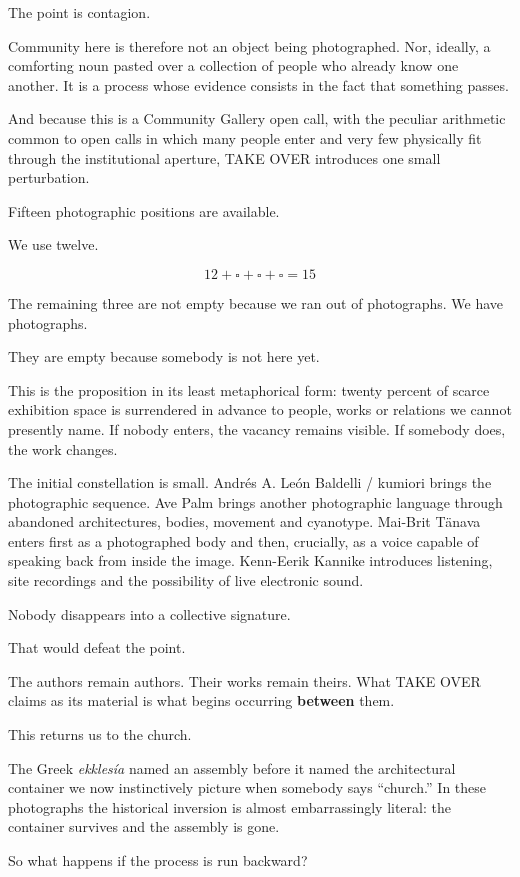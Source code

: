 The point is contagion.

Community here is therefore not an object being photographed. Nor,
ideally, a comforting noun pasted over a collection of people who
already know one another. It is a process whose evidence consists in the
fact that something passes.

And because this is a Community Gallery open call, with the peculiar
arithmetic common to open calls in which many people enter and very few
physically fit through the institutional aperture, TAKE OVER introduces
one small perturbation.

Fifteen photographic positions are available.

We use twelve.

\[
12+\square+\square+\square=15
\]

The remaining three are not empty because we ran out of photographs. We
have photographs.

They are empty because somebody is not here yet.

This is the proposition in its least metaphorical form: twenty percent
of scarce exhibition space is surrendered in advance to people, works or
relations we cannot presently name. If nobody enters, the vacancy
remains visible. If somebody does, the work changes.

The initial constellation is small. Andrés A. León Baldelli / kumiori
brings the photographic sequence. Ave Palm brings another photographic
language through abandoned architectures, bodies, movement and
cyanotype. Mai-Brit Tänava enters first as a photographed body and then,
crucially, as a voice capable of speaking back from inside the image.
Kenn-Eerik Kannike introduces listening, site recordings and the
possibility of live electronic sound.

Nobody disappears into a collective signature.

That would defeat the point.

The authors remain authors. Their works remain theirs. What TAKE OVER
claims as its material is what begins occurring \textbf{between} them.

This returns us to the church.

The Greek \emph{ekklesía} named an assembly before it named the
architectural container we now instinctively picture when somebody says
``church.'' In these photographs the historical inversion is almost
embarrassingly literal: the container survives and the assembly is gone.

So what happens if the process is run backward?

